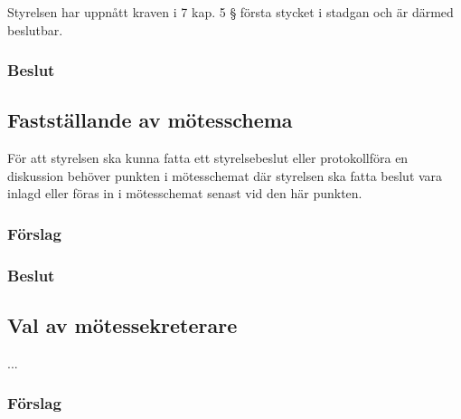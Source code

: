\documentclass[protokoll]{dvd}
\begin{document}
\begin{attsatser}
    \item Styrelsen har uppnått kraven i 7 kap. 5 § första stycket i stadgan och är därmed beslutbar.
\end{attsatser}
\subsubsection*{Beslut}
\begin{attsatser}
    \item %
\end{attsatser}


\subsection{Fastställande av mötesschema}

För att styrelsen ska kunna fatta ett styrelsebeslut eller protokollföra en diskussion behöver punkten i mötesschemat där styrelsen ska fatta beslut vara inlagd eller föras in i mötesschemat senast vid den här punkten.

\subsubsection*{Förslag}

\begin{attsatser}
    \item 
\end{attsatser}
\subsubsection*{Beslut}
\begin{attsatser}
    \item %
\end{attsatser}

\subsection{Val av mötessekreterare}
...

\subsubsection*{Förslag}
\begin{attsatser}
    \item 
\end{attsatser}
\end{document}

